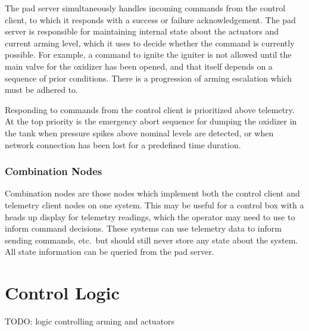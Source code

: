 The pad server simultaneously handles incoming commands from the control client, to which it responds with a success or
failure acknowledgement. The pad server is responsible for maintaining internal state about the actuators and current
arming level, which it uses to decide whether the command is currently possible. For example, a command to ignite the
igniter is not allowed until the main valve for the oxidizer has been opened, and that itself depends on a sequence of
prior conditions. There is a progression of arming escalation which must be adhered to.

Responding to commands from the control client is prioritized above telemetry. At the top priority is the emergency
abort sequence for dumping the oxidizer in the tank when pressure spikes above nominal levels are detected, or when
network connection has been lost for a predefined time duration.

\subsubsection{Combination Nodes}

Combination nodes are those nodes which implement both the control client and telemetry client nodes on one system.
This may be useful for a control box with a heads up display for telemetry readings, which the operator may need to use
to inform command decisions. These systems can use telemetry data to inform sending commands, etc.\ but should still
never store any state about the system. All state information can be queried from the pad server.

\section{Control Logic}

TODO: logic controlling arming and actuators
